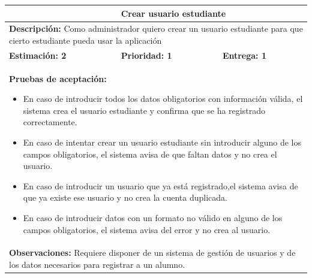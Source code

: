 \begin{table}[H]
\centering
{}
\begin{tabularx}{\textwidth}{|X|X|X|}
\hline
\rowcolor{azulclaro}
\multicolumn{1}{|l|}{\textbf{Identificador:} HU-A1} & \multicolumn{2}{l|}{\textbf{Crear usuario estudiante}} \\ \hline
\multicolumn{3}{|p{\dimexpr\textwidth-2\tabcolsep-2\arrayrulewidth}|}{\textbf{Descripción:} Como administrador quiero crear un usuario estudiante para que cierto estudiante pueda usar la aplicación} \\ \hline
\rowcolor{white}
\textbf{Estimación: 2} & \textbf{Prioridad: 1} & \textbf{Entrega: 1} \\ \hline
\multicolumn{3}{|p{\dimexpr\textwidth-2\tabcolsep-2\arrayrulewidth}|}{%
\textbf{Pruebas de aceptación:}
\begin{itemize}[leftmargin=1.5em, itemsep=2pt, topsep=3pt]
    \item En caso de introducir todos los datos obligatorios con información válida, el sistema crea el usuario estudiante y confirma que se ha registrado correctamente.
    \item En caso de intentar crear un usuario estudiante sin introducir alguno de los campos obligatorios, el sistema avisa de que faltan datos y no crea el usuario.
    \item En caso de introducir un usuario que ya está registrado,el sistema avisa de que ya existe ese usuario y no crea la cuenta duplicada.
    \item En caso de introducir datos con un formato no válido en alguno de los campos obligatorios, el sistema avisa del error y no crea al usuario.
\end{itemize}
} \\ \hline
\multicolumn{3}{|p{\dimexpr\textwidth-2\tabcolsep-2\arrayrulewidth}|}{\textbf{Observaciones:} Requiere disponer de un sistema de gestión de usuarios y de los datos necesarios para registrar a un alumno.} \\ \hline
\end{tabularx}
\end{table}

\vspace{0.4cm}

